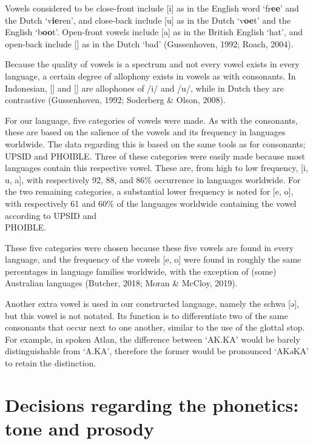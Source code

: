 Vowels considered to be close-front include [i] as in the English word ‘fr{\bf ee}’ and the Dutch ‘v{\bf ie}ren’, and close-back include [u] as in the Dutch ‘v{\bf oe}t’ and the English ‘b{\bf oo}t’. Open-front vowels include [a] as in the British English ‘hat’, and open-back include [\textscripta] as in the Dutch ‘bad’ (Gussenhoven, 1992; Roach, 2004). 

Because the quality of vowels is a spectrum and not every vowel exists in every language, a certain degree of allophony exists in vowels as with consonants. In Indonesian, [\textsci] and [\textupsilon] are allophones of /i/ and /u/, while in Dutch they are contrastive (Gussenhoven, 1992; Soderberg \& Olson, 2008). 

For our language, five categories of vowels were made. As with the consonants, these are based on the salience of the vowels and its frequency in languages worldwide. The data regarding this is based on the same tools as for consonants; UPSID and PHOIBLE. Three of these categories were easily made because most languages contain this respective vowel. These are, from high to low frequency, [i, u, a], with respectively 92, 88, and 86\% occurrence in languages worldwide. For the two remaining categories, a substantial lower frequency is noted for [e, o], with respectively 61 and 60\% of the languages worldwide containing the vowel according to UPSID and \\ PHOIBLE. 

These five categories were chosen because these five vowels are found in every language, and the frequency of the vowels [e, o] were found in roughly the same percentages in language families worldwide, with the exception of (some) Australian languages (Butcher, 2018; Moran \& McCloy, 2019). 

Another extra vowel is used in our constructed language, namely the schwa [ə], but this vowel is not notated. Its function is to differentiate two of the same consonants that occur next to one another, similar to the use of the glottal stop. For example, in spoken Atlan, the difference between ‘AK.KA’ would be barely distinguishable from ‘A.KA’, therefore the former would be pronounced ‘AKəKA’ to retain the distinction. 

\section{Decisions regarding the phonetics: tone and prosody}

